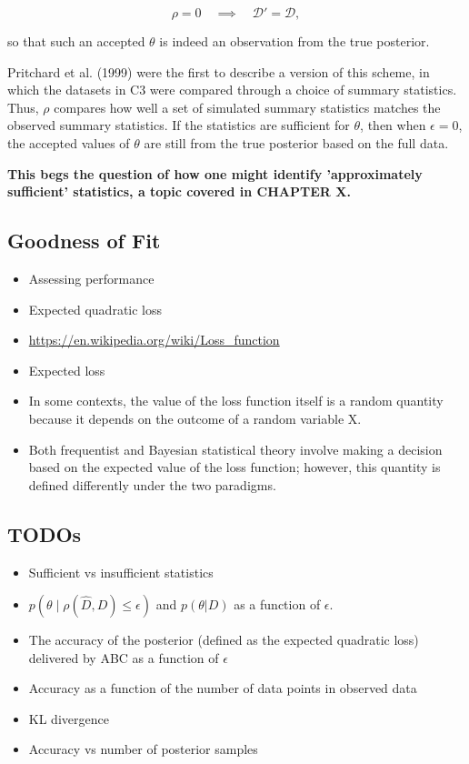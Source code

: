 \begin{equation*}
    \rho = 0 \quad \implies \quad \mathcal{D}'=\mathcal{D},
\end{equation*}

so that such an accepted $\theta$ is indeed an observation from the true posterior. 

Pritchard et al. (1999) were the first to describe a version of this scheme, in which the datasets in C3 were compared through a choice of summary statistics. Thus, $\rho$ compares how well a set of simulated summary statistics matches the observed summary statistics. If the statistics are sufficient for $\theta$, then when $\epsilon=0$, the accepted values of $\theta$ are still from the true posterior based on the full data. 

\textbf{This begs the question of how one might identify 'approximately sufficient' statistics, a topic covered in CHAPTER X.}

\subsection{Goodness of Fit}

\begin{itemize}
    \item Assessing performance 
    \item Expected quadratic loss
    \item \url{https://en.wikipedia.org/wiki/Loss_function}
    \item Expected loss
    \item In some contexts, the value of the loss function itself is a random quantity because it depends on the outcome of a random variable X.
    \item Both frequentist and Bayesian statistical theory involve making a decision based on the expected value of the loss function; however, this quantity is defined differently under the two paradigms.
\end{itemize}

\subsection{TODOs}

\begin{itemize}
    \item Sufficient vs insufficient statistics 
    \item $p(\theta \mid \rho (\hat{D}, D) \leq \epsilon)$ and $p(\theta |D)$ as a function of $\epsilon$. 
    \item The accuracy of the posterior (defined as the expected quadratic loss) delivered by ABC as a function of $\epsilon$
    \item Accuracy as a function of the number of data points in observed data
    \item KL divergence
    \item Accuracy vs number of posterior samples
\end{itemize}
